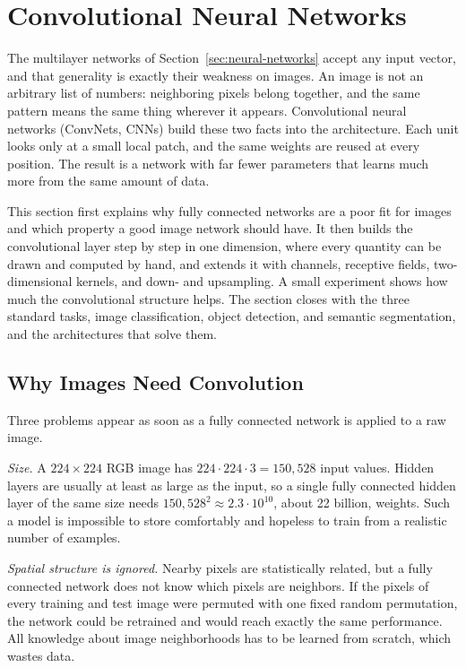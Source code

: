 \section{Convolutional Neural Networks}
\label{sec:cnn}

The multilayer networks of Section~\ref{sec:neural-networks} accept any input
vector, and that generality is exactly their weakness on images. An image is not
an arbitrary list of numbers: neighboring pixels belong together, and the same
pattern means the same thing wherever it appears. Convolutional neural networks
(ConvNets, CNNs) build these two facts into the architecture. Each unit looks
only at a small local patch, and the same weights are reused at every position.
The result is a network with far fewer parameters that learns much more from the
same amount of data.

This section first explains why fully connected networks are a poor fit for
images and which property a good image network should have. It then builds the
convolutional layer step by step in one dimension, where every quantity can be
drawn and computed by hand, and extends it with channels, receptive fields,
two-dimensional kernels, and down- and upsampling. A small experiment shows how
much the convolutional structure helps. The section closes with the three
standard tasks, image classification, object detection, and semantic
segmentation, and the architectures that solve them.

\subsection{Why Images Need Convolution}

Three problems appear as soon as a fully connected network is applied to a raw
image.

\emph{Size.} A $224\times224$ RGB image has $224\cdot224\cdot3 = 150{,}528$
input values. Hidden layers are usually at least as large as the input, so a
single fully connected hidden layer of the same size needs
$150{,}528^2 \approx 2.3\cdot10^{10}$, about 22 billion, weights. Such a model is
impossible to store comfortably and hopeless to train from a realistic number of
examples.

\emph{Spatial structure is ignored.} Nearby pixels are statistically related,
but a fully connected network does not know which pixels are neighbors. If the
pixels of every training and test image were permuted with one fixed random
permutation, the network could be retrained and would reach exactly the same
performance. All knowledge about image neighborhoods has to be learned from
scratch, which wastes data.

